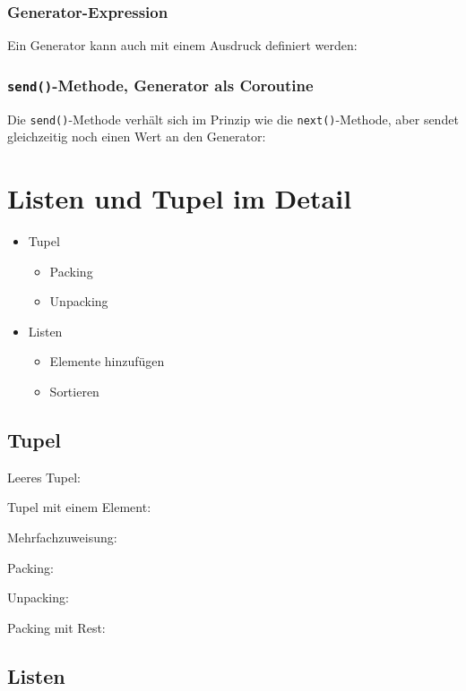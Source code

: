\subsubsection{Generator-Expression}
Ein Generator kann auch mit einem Ausdruck definiert werden:


\subsubsection{\texttt{send()}-Methode, Generator als Coroutine}
Die \texttt{send()}-Methode verhält sich im Prinzip wie die \texttt{next()}-Methode, aber sendet gleichzeitig noch einen Wert an den Generator:


\section{Listen und Tupel im Detail}
\begin{itemize}
	\item Tupel
	\begin{itemize}
		\item Packing
		\item Unpacking
	\end{itemize}
	\item Listen
	\begin{itemize}
		\item Elemente hinzufügen
		\item Sortieren
	\end{itemize}
\end{itemize}

\subsection{Tupel}
Leeres Tupel:

Tupel mit einem Element:

Mehrfachzuweisung:

\begin{multicols}{2}
	Packing:
	
	\columnbreak
	Unpacking:
	
	\vfill\null
\end{multicols}
Packing mit Rest:


\subsection{Listen}

